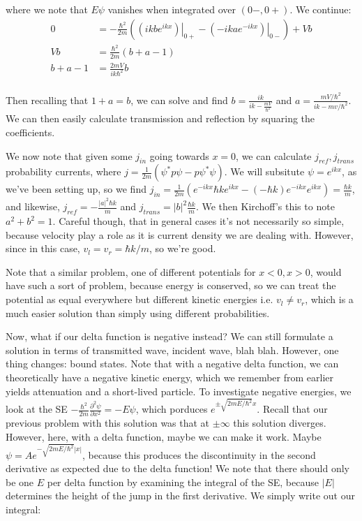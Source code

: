 \documentclass{report}
\begin{document}
where we note that $E\psi$ vanishes when integrated over $(0-,0+)$. We continue:
\begin{align*}
0 &= -\frac{\hbar^2}{2m}\left(\left.\left(ikbe^{ikx}\right)\right|_{0+} - \left.\left(-ikae^{-ikx}\right)\right|_{0-}\right) + Vb\\
Vb &= \frac{\hbar^2}{2m}\left(b + a - 1\right)\\
b+a-1 &= \frac{2mV}{ik\hbar^2}b\\
\end{align*}

Then recalling that $1+a=b$, we can solve and find $b = \frac{ik}{ik - \frac{mV}{\hbar^2}}$ and $a = \frac{mV/\hbar^2}{ik - mv/\hbar^2}$. We can then easily calculate transmission and reflection by squaring the coefficients.

We now note that given some $j_{in}$ going towards $x=0$, we can calculate $j_{ref}, j_{trans}$ probability currents, where $j = \frac{1}{2m}\left(\psi^*p\psi - p\psi^*\psi\right)$. We will subsitute $\psi = e^{ikx}$, as we've been setting up, so we find $j_{in} = \frac{1}{2m}\left(e^{-ikx}\hbar ke^{ikx} - (-\hbar k)e^{-ikx}e^{ikx}\right) = \frac{\hbar k}{m}$, and likewise, $j_{ref} = -\frac{|a|^2\hbar k}{m}$ and $j_{trans} = |b|^2\frac{\hbar k}{m}$. We then Kirchoff's this to note $a^2+b^2 = 1$. Careful though, that in general cases it's not necessarily so simple, because velocity play a role as it is current density we are dealing with. However, since in this case, $v_l = v_r = \hbar k/m$, so we're good. 

Note that a similar problem, one of different potentials for $x<0, x>0$, would have such a sort of problem, because energy is conserved, so we can treat the potential as equal everywhere but different kinetic energies i.e. $v_l \neq v_r$, which is a much easier solution than simply using different probabilities. 

Now, what if our delta function is negative instead? We can still formulate a solution in terms of transmitted wave, incident wave, blah blah. However, one thing changes: bound states. Note that with a negative delta function, we can theoretically have a negative kinetic energy, which we remember from earlier yields attenuation and a short-lived particle. To investigate negative energies, we look at the SE $-\frac{\hbar^2}{2m}\frac{\partial^2 \psi}{\partial x^2} = -E\psi$, which porduces $e^{\pm\sqrt{2mE/\hbar^2}x}$. Recall that our previous problem with this solution was that at $\pm \infty$ this solution diverges. However, here, with a delta function, maybe we can make it work. Maybe $\psi = Ae^{-\sqrt{2mE/\hbar^2}|x|}$, because this produces the discontinuity in the second derivative as expected due to the delta function! We note that there should only be one $E$ per delta function by examining the integral of the SE, because $|E|$ determines the height of the jump in the first derivative. We simply write out our integral:
\end{document}
